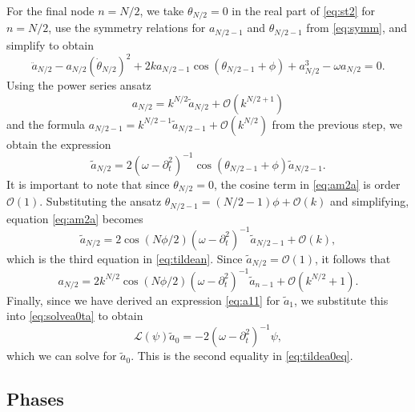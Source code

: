 \documentclass[11pt,reqno]{amsart}
\def\calL{{\mathcal L}}
\begin{document}
For the final node $n=N/2$, we take $\theta_{N/2} = 0$ in the real part of \cref{eq:st2} for $n = N/2$, use the symmetry relations for $a_{N/2-1}$ and $\theta_{N/2-1}$ from \cref{eq:symm}, and simplify to obtain
\[
\ddot a_{N/2} - a_{N/2} (\dot \theta_{N/2})^2 + 
2 k a_{N/2-1}\cos( \theta_{N/2-1} + \phi) + a_{N/2}^3 - \omega a_{N/2} = 0.
\]
Using the power series ansatz
\[
a_{N/2} = k^{N/2} \widetilde{a}_{N/2} + \mathcal{O}(k^{N/2+1})
\]
and the formula $a_{N/2-1} = k^{N/2-1} \widetilde{a}_{N/2-1} + \mathcal{O}(k^{N/2})$ from the previous step, we obtain the expression
\begin{equation}\label{eq:am2a}
\widetilde{a}_{N/2} = 2 (\omega - \partial_t^2)^{-1}\cos( \theta_{N/2-1} + \phi) \widetilde{a}_{N/2-1}.
\end{equation}
It is important to note that since $\theta_{N/2} = 0$, the cosine term in \cref{eq:am2a} is order $\mathcal{O}(1)$. Substituting the ansatz $\theta_{N/2-1} = (N/2-1)\phi + \mathcal{O}(k)$ and simplifying, equation \cref{eq:am2a} becomes
\begin{equation}\label{eq:am2}
\widetilde{a}_{N/2} = 2 \cos( N\phi/2)(\omega - \partial_t^2)^{-1} \widetilde{a}_{N/2-1} + \mathcal{O}(k),
\end{equation}
which is the third equation in \cref{eq:tildean}. Since $\widetilde{a}_{N/2} = \mathcal{O}(1)$, it follows that
\begin{equation}\label{eq:am2eq}
a_{N/2} = 2 k^{N/2} \cos\left( N\phi / 2\right) (\omega - \partial_t^2)^{-1} \widetilde{a}_{n-1} + \mathcal{O}(k^{N/2}+1).
\end{equation}
Finally, since we have derived an expression \cref{eq:a11} for $\widetilde{a}_1$, we substitute this into \cref{eq:solvea0ta} to obtain 
\[
\calL(\psi) \widetilde{a}_0 = -2 (\omega - \partial_t^2)^{-1} \psi,
\]
which we can solve for $\widetilde{a}_0$. This is the second equality in \cref{eq:tildea0eq}.

\subsection{Phases}
\end{document}
